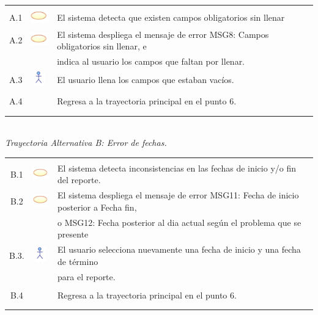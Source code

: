 \documentclass[10pt,spanish]{article}
\providecommand{\tabularnewline}{\\}
\begin{document}
	\begin{tabular}{ccl}
	& & \tabularnewline
			
	A.1 & \includegraphics{sistema} & El sistema detecta que existen campos obligatorios sin llenar\tabularnewline
	
	A.2 & \includegraphics{sistema} & El sistema despliega el mensaje de error MSG8: Campos obligatorios sin llenar, e \tabularnewline
	& & indica al usuario los campos que faltan por llenar. \tabularnewline

    A.3 & \includegraphics{actor} & El usuario llena los campos que estaban vacíos.\tabularnewline
	\tabularnewline
	
	A.4 & &	Regresa a la trayectoria principal en el punto 6.\tabularnewline

	
	\tabularnewline\tabularnewline	
	\end{tabular}
	
	\textit{\large \\Trayectoria Alternativa B: Error de fechas.}
	
	\begin{tabular}{ccl}
	& & \tabularnewline
			
	B.1 & \includegraphics{sistema} & El sistema detecta inconsistencias en las fechas de inicio y/o fin del reporte.\tabularnewline
	
	B.2 & \includegraphics{sistema} & El sistema despliega el mensaje de error MSG11: Fecha de inicio posterior a Fecha fin,  \tabularnewline
	& & o MSG12: Fecha posterior al dia actual según el problema que se presente \tabularnewline

    B.3. & \includegraphics{actor} & El usuario selecciona nuevamente una fecha de inicio y una fecha de término \tabularnewline
	&  & para el reporte.\tabularnewline\tabularnewline
	
	B.4 & &	Regresa a la trayectoria principal en el punto 6.\tabularnewline

	
	\tabularnewline\tabularnewline	
	\end{tabular}
\end{document}
